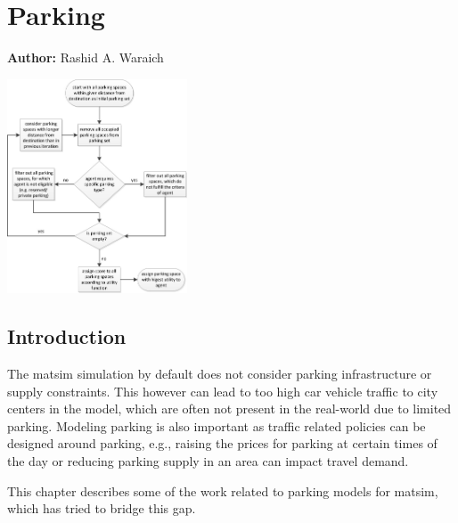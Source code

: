 \chapter{Parking}
\label{ch:parking}

\hfill \textbf{Author:} Rashid A. Waraich

\begin{center} \includegraphics[width=0.4\textwidth, angle=0]{extending/figures/Parking/parking_algo.png} \end{center}


\section{Introduction} 
The \gls{matsim} simulation by default does not consider parking infrastructure or supply constraints. This however can lead to too high car vehicle traffic to city centers in the model, which are often not present in the real-world due to limited parking. Modeling parking is also important as traffic related policies can be designed around parking, e.g., raising the prices for parking at certain times of the day or reducing parking supply in an area can impact travel demand. 

This chapter describes some of the work related to parking models for \gls{matsim}, which has tried to bridge this gap.

